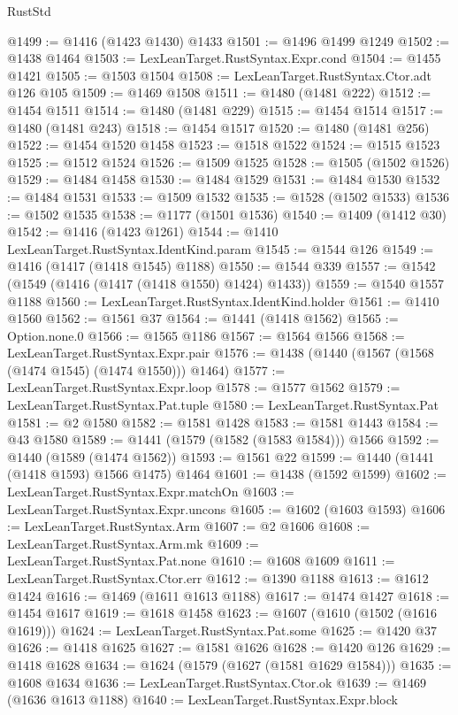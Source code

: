 \begin{lexlean}{RustStd}
\begin{coremodule}
{\begin{coremodule}
{{{{{{{{{{{{{{{{{{{{{{{{{{{{{{{@1499 := @1416 (@1423 @1430) @1433
@1501 := @1496 @1499 @1249
@1502 := @1438 @1464
@1503 := LexLeanTarget.RustSyntax.Expr.cond
@1504 := @1455 @1421
@1505 := @1503 @1504
@1508 := LexLeanTarget.RustSyntax.Ctor.adt @126 @105
@1509 := @1469 @1508
@1511 := @1480 (@1481 @222)
@1512 := @1454 @1511
@1514 := @1480 (@1481 @229)
@1515 := @1454 @1514
@1517 := @1480 (@1481 @243)
@1518 := @1454 @1517
@1520 := @1480 (@1481 @256)
@1522 := @1454 @1520 @1458
@1523 := @1518 @1522
@1524 := @1515 @1523
@1525 := @1512 @1524
@1526 := @1509 @1525
@1528 := @1505 (@1502 @1526)
@1529 := @1484 @1458
@1530 := @1484 @1529
@1531 := @1484 @1530
@1532 := @1484 @1531
@1533 := @1509 @1532
@1535 := @1528 (@1502 @1533)
@1536 := @1502 @1535
@1538 := @1177 (@1501 @1536)
@1540 := @1409 (@1412 @30)
@1542 := @1416 (@1423 @1261)
@1544 := @1410 LexLeanTarget.RustSyntax.IdentKind.param
@1545 := @1544 @126
@1549 := @1416 (@1417 (@1418 @1545) @1188)
@1550 := @1544 @339
@1557 := @1542 (@1549 (@1416 (@1417 (@1418 @1550) @1424) @1433))
@1559 := @1540 @1557 @1188
@1560 := LexLeanTarget.RustSyntax.IdentKind.holder
@1561 := @1410 @1560
@1562 := @1561 @37
@1564 := @1441 (@1418 @1562)
@1565 := Option.none.{0}
@1566 := @1565 @1186
@1567 := @1564 @1566
@1568 := LexLeanTarget.RustSyntax.Expr.pair
@1576 := @1438 (@1440 (@1567 (@1568 (@1474 @1545) (@1474 @1550))) @1464)
@1577 := LexLeanTarget.RustSyntax.Expr.loop
@1578 := @1577 @1562
@1579 := LexLeanTarget.RustSyntax.Pat.tuple
@1580 := LexLeanTarget.RustSyntax.Pat
@1581 := @2 @1580
@1582 := @1581 @1428
@1583 := @1581 @1443
@1584 := @43 @1580
@1589 := @1441 (@1579 (@1582 (@1583 @1584))) @1566
@1592 := @1440 (@1589 (@1474 @1562))
@1593 := @1561 @22
@1599 := @1440 (@1441 (@1418 @1593) @1566 @1475) @1464
@1601 := @1438 (@1592 @1599)
@1602 := LexLeanTarget.RustSyntax.Expr.matchOn
@1603 := LexLeanTarget.RustSyntax.Expr.uncons
@1605 := @1602 (@1603 @1593)
@1606 := LexLeanTarget.RustSyntax.Arm
@1607 := @2 @1606
@1608 := LexLeanTarget.RustSyntax.Arm.mk
@1609 := LexLeanTarget.RustSyntax.Pat.none
@1610 := @1608 @1609
@1611 := LexLeanTarget.RustSyntax.Ctor.err
@1612 := @1390 @1188
@1613 := @1612 @1424
@1616 := @1469 (@1611 @1613 @1188)
@1617 := @1474 @1427
@1618 := @1454 @1617
@1619 := @1618 @1458
@1623 := @1607 (@1610 (@1502 (@1616 @1619)))
@1624 := LexLeanTarget.RustSyntax.Pat.some
@1625 := @1420 @37
@1626 := @1418 @1625
@1627 := @1581 @1626
@1628 := @1420 @126
@1629 := @1418 @1628
@1634 := @1624 (@1579 (@1627 (@1581 @1629 @1584)))
@1635 := @1608 @1634
@1636 := LexLeanTarget.RustSyntax.Ctor.ok
@1639 := @1469 (@1636 @1613 @1188)
@1640 := LexLeanTarget.RustSyntax.Expr.block
}}}}}}}}}}}}}}}}}}}}}}}}}}}}}}}
\end{coremodule}}
\end{coremodule}
\end{lexlean}

